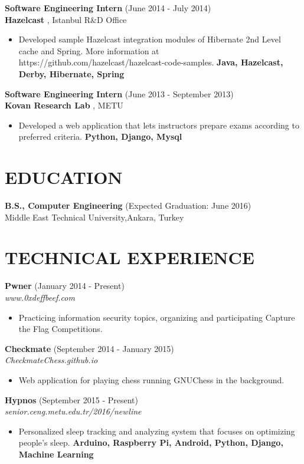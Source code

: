 \documentclass[margin, 10pt]{res} %
\begin{document}
\begin{resume}
{\bf Software Engineering Intern} \hfill (June 2014 - July 2014) \\
{\bf Hazelcast }, Istanbul R\&D Office
\begin{itemize} 
\item Developed sample Hazelcast integration modules of Hibernate 2nd Level cache and Spring. More information at https://github.com/hazelcast/hazelcast-code-samples. {\bf Java, Hazelcast, Derby, Hibernate, Spring }
\end{itemize} 

{\bf Software Engineering Intern} \hfill (June 2013 - September 2013) \\
{\bf Kovan Research Lab }, METU
\begin{itemize}
\item Developed a web application that lets instructors prepare exams according to preferred criteria. {\bf Python, Django, Mysql }
\end{itemize} 





\section{EDUCATION}

{\bf B.S., Computer Engineering } \hfill {(Expected Graduation: June 2016)}\\
Middle East Technical University,Ankara, Turkey


\section{TECHNICAL EXPERIENCE}

{\bf Pwner} \hfill (January 2014 - Present) \\
\textit{www.0xdeffbeef.com}
\begin{itemize} 
\item Practicing information security topics, organizing and participating Capture the Flag Competitions. 
\end{itemize} 

{\bf Checkmate} \hfill (September 2014 - January 2015) \\
\textit{CheckmateChess.github.io}
\begin{itemize} 
\item Web application for playing chess running GNUChess in the background.
\end{itemize} 

{\bf Hypnos} \hfill (September 2015 - Present) \\
\textit{senior.ceng.metu.edu.tr/2016/newline}
\begin{itemize} 
\item Personalized sleep tracking and analyzing system that focuses on optimizing people's sleep. {\bf Arduino, Raspberry Pi, Android, Python, Django, Machine Learning }
\end{itemize} 






\end{resume}
\end{document}
